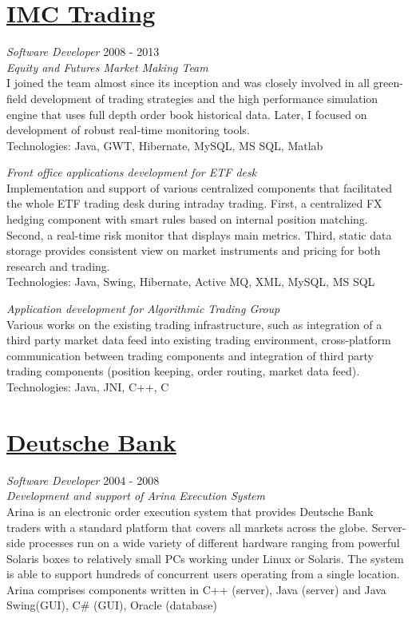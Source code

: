 \documentclass[margin, 10pt]{res}
\begin{document}
\begin{resume}
\section{\href{http://imc.nl}{IMC Trading}}
{\sl Software Developer} \hfill 2008 - 2013 \\
{\sl Equity and Futures Market Making Team} \\
I joined the team almost since its inception and was closely involved in all green-field development of trading strategies and the high performance simulation engine that uses full depth order book historical data. Later, I focused on development of robust real-time monitoring tools. \\  
Technologies: Java, GWT, Hibernate, MySQL, MS SQL, Matlab  

{\sl Front office applications development for ETF desk  } \\
Implementation and support of various centralized components that facilitated the whole ETF trading desk during intraday trading. First, a centralized FX hedging component with smart rules based on internal position matching. Second, a real-time risk monitor that displays main metrics. Third, static data storage provides consistent view on market instruments and pricing for both research and trading.  \\
Technologies: Java, Swing, Hibernate, Active MQ, XML, MySQL, MS SQL  

{\sl Application development for Algorithmic Trading Group }\\
Various works on the existing trading infrastructure, such as integration of a third party market data feed into existing trading environment, cross-platform communication between trading components and integration of third party trading components (position keeping, order routing, market data feed).\\
Technologies: Java, JNI, C++, C

\section{\href{http://db.com}{Deutsche Bank}}
{\sl Software Developer} \hfill 2004 - 2008 \\
{\sl Development and support of Arina Execution System } \\
Arina is an electronic order execution system that provides Deutsche Bank traders with a standard platform that covers all markets across the globe. Server-side processes run on a  wide variety of different hardware ranging from powerful Solaris boxes to relatively small PCs working under Linux or Solaris. The system is able to support hundreds of concurrent users operating from a single location. Arina comprises components written in C++ (server), Java (server) and Java Swing(GUI), C\# (GUI), Oracle (database)


\end{resume}
\end{document}
